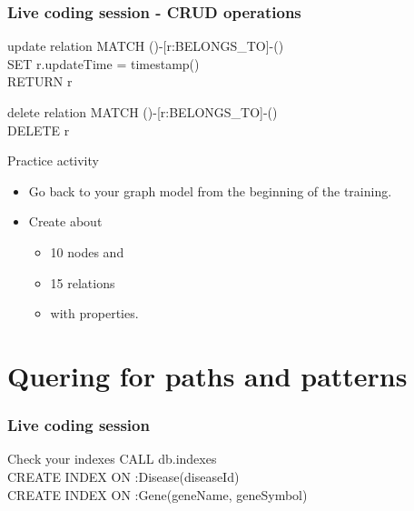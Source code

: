\documentclass[12pt]{beamer}
\begin{document}
    \begin{frame}
        \frametitle{Live coding session - CRUD operations}
        \begin{block}{update relation}
            MATCH ()-[r:BELONGS\_TO]-()\\
            \hspace{1cm} SET r.updateTime = timestamp()\\
            \hspace{1cm} RETURN r
        \end{block}
        \begin{block}{delete relation}
            MATCH ()-[r:BELONGS\_TO]-()\\
            \hspace{1cm} DELETE r
        \end{block}
    \end{frame}
    
    \begin{frame}{Practice activity}
        \begin{itemize}
            \item Go back to your graph model from the beginning of the training.
            \item Create about
            \begin{itemize}
                \item 10 nodes and
                \item 15 relations
                \item with properties.
            \end{itemize}
        \end{itemize}
    \end{frame}
    
    \section{Quering for paths and patterns}
    \begin{frame}
        \frametitle{Live coding session}
        \begin{block}{Check your indexes}
            CALL db.indexes\\
            CREATE INDEX ON :Disease(diseaseId)\\
            CREATE INDEX ON :Gene(geneName, geneSymbol)\\
        \end{block}
    \end{frame}
    
\end{document}
